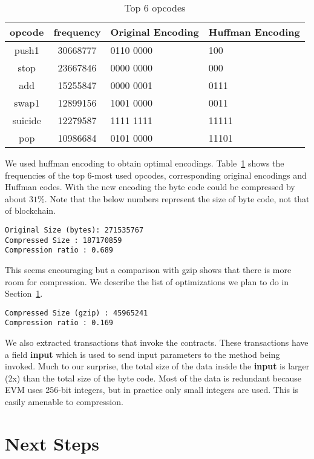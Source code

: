 \documentclass[12pt]{article}
\begin{document}
\begin{table}[H]
\centering
\begin{tabular}{c | c | p{4cm} | p{4cm} }
	opcode & frequency & {Original Encoding} & {Huffman Encoding}  \\
\hline
push1 & 30668777 & 0110 0000 & 100\\
stop & 23667846 & 0000 0000 & 000 \\
add  & 15255847 & 0000 0001  & 0111\\
swap1  & 12899156 &1001 0000 & 0011 \\
suicide & 12279587 &1111 1111 & 11111 \\
pop    & 10986684 &0101 0000 & 11101 \\
\hline
\end{tabular}
\caption{Top 6 opcodes}
\label{tab:freqopcodes}
\end{table}

We used huffman encoding to obtain optimal encodings.
Table~\ref{tab:freqopcodes} shows the frequencies of the top 6-most used opcodes, corresponding original encodings and Huffman codes.
With the new encoding the byte code could be compressed by about $31\%$. 
Note that the below numbers represent the size of byte code, not that of blockchain.

\begin{lstlisting}
Original Size (bytes): 271535767
Compressed Size : 187170859
Compression ratio : 0.689
\end{lstlisting}

This seems encouraging but a comparison with gzip shows that there is more room for compression. We describe the list of optimizations we plan to
do in Section~\ref{sec:next}.
\begin{lstlisting}
Compressed Size (gzip) : 45965241
Compression ratio : 0.169
\end{lstlisting}

We also extracted transactions that invoke the contracts. 
These transactions have a field \textbf{input} which is used to send input parameters to the method being invoked.
Much to our surprise, the total size of the data inside the \textbf{input} is larger (2x) 
than the total size of the byte code. Most of the data is redundant because EVM uses 256-bit integers, but in practice only small integers are used.
This is easily amenable to compression.

\section{Next Steps}\label{sec:next}
\end{document}
